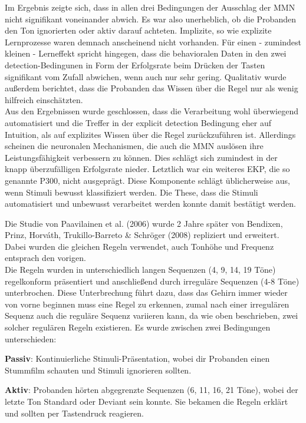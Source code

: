 \documentclass[doc,a4paper,12pt]{apa6}
\begin{document}
Im Ergebnis zeigte sich, dass in allen drei Bedingungen der Ausschlag der MMN nicht signifikant voneinander abwich. Es war also unerheblich, ob die Probanden den Ton ignorierten oder aktiv darauf achteten. Implizite, so wie explizite Lernprozesse waren demnach anscheinend nicht vorhanden. Für einen - zumindest kleinen - Lerneffekt spricht hingegen, dass die behavioralen Daten in den zwei detection-Bedingunen in Form der Erfolgsrate beim Drücken der Tasten signifikant vom Zufall abwichen, wenn auch nur sehr gering. Qualitativ wurde außerdem berichtet, dass die Probanden das Wissen über die Regel nur als wenig hilfreich einschätzten.\\
Aus den Ergebnissen wurde geschlossen, dass die Verarbeitung wohl überwiegend automatisiert und die Treffer in der explicit detection Bedingung eher auf Intuition, als auf explizites Wissen über die Regel zurückzuführen ist. Allerdings scheinen die neuronalen Mechanismen, die auch die MMN auslösen ihre Leistungsfähigkeit verbessern zu können. Dies schlägt sich zumindest in der knapp überzufälligen Erfolgsrate nieder. Letztlich war ein weiteres EKP, die so genannte P300, nicht ausgeprägt. Diese Komponente schlägt üblicherweise aus, wenn Stimuli bewusst klassifiziert werden. Die These, dass die Stimuli automatisiert und unbewusst verarbeitet werden konnte damit bestätigt werden.

Die Studie von Paavilainen et al. (2006) wurde 2 Jahre später von Bendixen, Prinz, Horváth, Trukillo-Barreto \& Schröger (2008) repliziert und erweitert. Dabei wurden die gleichen Regeln verwendet, auch Tonhöhe und Frequenz entsprach den vorigen.\\
Die Regeln wurden in unterschiedlich langen Sequenzen (4, 9, 14, 19 Töne) regelkonform präsentiert und anschließend durch irreguläre Sequenzen (4-8 Töne) unterbrochen. Diese Unterbrechung führt dazu, dass das Gehirn immer wieder von vorne beginnen muss eine Regel zu erkennen, zumal nach einer irregulären Sequenz auch die reguläre Sequenz variieren kann, da wie oben beschrieben, zwei solcher regulären Regeln existieren. Es wurde zwischen zwei Bedingungen unterschieden:

\begin{compactitem}
  \item \textbf{Passiv}: Kontinuierliche Stimuli-Präsentation, wobei dir Probanden einen Stummfilm schauten und Stimuli ignorieren sollten.
  \item \textbf{Aktiv}: Probanden hörten abgegrenzte Sequenzen (6, 11, 16, 21 Töne), wobei der letzte Ton Standard oder Deviant sein konnte. Sie bekamen die Regeln erklärt und sollten per Tastendruck reagieren.
\end{compactitem}
\end{document}
